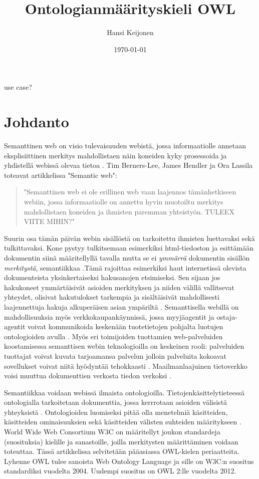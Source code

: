 \documentclass[finnish]{tktltiki2}
\title{Ontologianmäärityskieli OWL}
\author{Hansi Keijonen}
\date{\today}
\theoremstyle{definition}
\theoremstyle{remark}
\begin{document}

\maketitle        %
\makeabstract     %

\tableofcontents  %
\newpage          %


use case?

\section{Johdanto}
Semanttinen web on visio tulevaisuuden webistä, jossa informaatiolle annetaan eksplisiittinen
merkitys mahdollistaen näin koneiden kyky prosessoida ja yhdistellä webissä olevaa tietoa \cite{MH04}.  
Tim Berners-Lee, James Hendler ja Ora Lassila toteavat
artikkelissa "Semantic web":
\begin{quote}
"Semanttinen web ei ole erillinen web vaan
laajennos tämänhetkiseen webiin, jossa informaatiolle on annettu hyvin muotoiltu
merkitys mahdollistaen koneiden ja ihmisten paremman yhteistyön. TULEEX VIITE MIHIN?"
\end{quote}
Suurin osa tämän päivän webin sisällöstä on tarkoitettu ihmisten luettavaksi sekä tulkittavaksi.
Kone pystyy tulkitsemaan esimerkiksi html-tiedoston ja esittämään
dokumentin siinä määritellyllä tavalla mutta se ei
\textit{ymmärrä} dokumentin sisällön \textit{merkitystä}, semantiikkaa \cite{BHL01}.Tämä 
rajoittaa esimerkiksi haut internetissä olevista dokumenteista yksinkertaiseksi hakusanojen
etsimiseksi. Sen sijaan jos hakukoneet ymmärtäisivät asioiden merkityksen ja
niiden välillä vallitsevat yhteydet, olisivat hakutulokset tarkempia
ja sisältäisivät mahdollisesti laajennettuja hakuja alkuperäisen asian ympäriltä
\cite{SHIQ}. Semanttisella webillä on mahdollisuuksia myös verkkokaupankäynnissä, jossa 
myyjäagentit ja ostaja-agentit voivat kommunikoida keskenään tuotetietojen pohjalta luotujen 
ontologioiden avulla \cite{SHIQ}. Myös eri toimijoiden tuottamien web-palveluiden koostamisessa semanttisen 
webin teknologioilla on keskeinen rooli: palveluiden tuottajat voivat kuvata tarjoamansa
palvelun jolloin palveluita kokoavat sovellukset voivat niitä hyödyntää tehokkaasti \cite{SHIQ}. 
Maailmanlaajuinen tietoverkko voisi muuttua dokumenttien verkosta 
tiedon verkoksi \cite{BHL01}. 

Semantiikkaa voidaan webissä ilmaista ontologioilla. Tietojenkäsittelytieteessä
ontologialla tarkoitetaan dokumenttia, jossa kerrrotaan asioiden välisistä
yhteyksistä \cite{BHL01}.
Ontologioiden luomiseksi pitää olla menetelmiä käsitteiden, käsitteiden
ominaisuuksien sekä käsitteiden välisten suhteiden määritykseen
\cite{BHL01}. World Wide Web Consortium W3C on määritellyt 
joukon standardeja (suosituksia) kielille ja sanastoille, joilla merkitysten määrittäminen voidaan toteuttaa.
Tässä artikkelissa selvitetään pääasiassa OWL-kielen periaatteita. Lyhenne OWL tulee sanoista Web Ontology Language ja sille on
W3C:n suositus standardiksi vuodelta 2004. Uudempi suositus on OWL 2:lle vuodelta 2012. 
\end{document}

